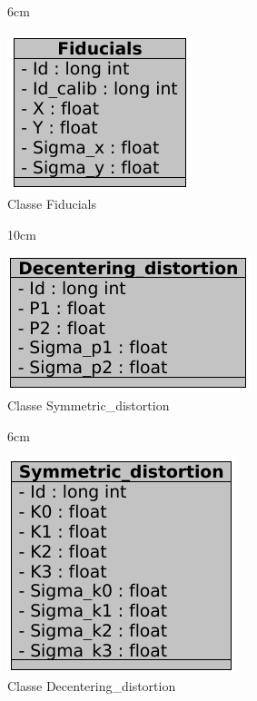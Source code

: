 \begin{figure}[!ht]{6cm}
  \caption{Classe Fiducials} \label{fid}
  \centering
  \includegraphics[width=0.75\hsize]{figuras/38.png}
\end{figure}

\begin{figure}[!ht]{10cm}
  \caption{Classe Symmetric\_distortion} \label{sym}
  \centering
  \includegraphics[width=0.5\hsize]{figuras/43.png}
\end{figure}

\begin{figure}[!ht]{6cm}
  \caption{Classe Decentering\_distortion} \label{dis}
  \centering
  \includegraphics[width=0.75\hsize]{figuras/40.png}
\end{figure}

